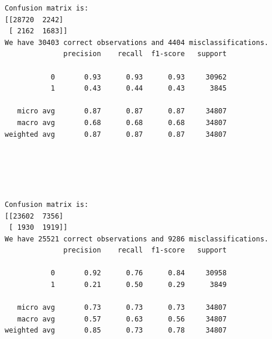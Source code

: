 \documentclass[8pt,onecolumn,aps,pra]{revtex4-1}
\begin{document}
    \begin{Verbatim}[commandchars=\\\{\}]
Confusion matrix is:
[[28720  2242]
 [ 2162  1683]]
We have 30403 correct observations and 4404 misclassifications.
              precision    recall  f1-score   support

           0       0.93      0.93      0.93     30962
           1       0.43      0.44      0.43      3845

   micro avg       0.87      0.87      0.87     34807
   macro avg       0.68      0.68      0.68     34807
weighted avg       0.87      0.87      0.87     34807


    \end{Verbatim}

    \begin{center}
    \end{center}
    { \hspace*{\fill} \\}
    
    \begin{center}
    \end{center}
    { \hspace*{\fill} \\}
    
    \begin{Verbatim}[commandchars=\\\{\}]
Confusion matrix is:
[[23602  7356]
 [ 1930  1919]]
We have 25521 correct observations and 9286 misclassifications.
              precision    recall  f1-score   support

           0       0.92      0.76      0.84     30958
           1       0.21      0.50      0.29      3849

   micro avg       0.73      0.73      0.73     34807
   macro avg       0.57      0.63      0.56     34807
weighted avg       0.85      0.73      0.78     34807


    \end{Verbatim}

    \begin{center}
    \end{center}
    { \hspace*{\fill} \\}
    
\end{document}
